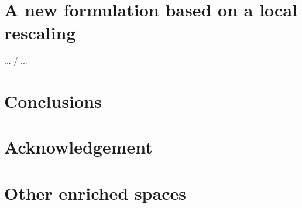 \documentclass[3p]{elsarticle}
\begin{document}
\section{A new formulation based on a local rescaling}

\vglue 2mm
...  /  ...
\vglue 2mm

\section{Conclusions}



\section*{Acknowledgement}


\appendix

\section{Other enriched spaces}





\end{document}
